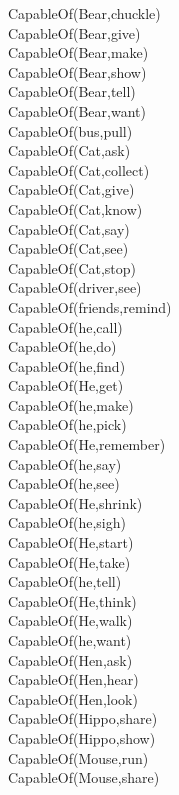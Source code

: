 \begin{multicols}{2}
\begin{footnotesize}
\noindent
CapableOf(Bear,chuckle) \\
CapableOf(Bear,give) \\
CapableOf(Bear,make) \\
CapableOf(Bear,show) \\
CapableOf(Bear,tell) \\
CapableOf(Bear,want) \\
CapableOf(bus,pull) \\
CapableOf(Cat,ask) \\
CapableOf(Cat,collect) \\
CapableOf(Cat,give) \\
CapableOf(Cat,know) \\
CapableOf(Cat,say) \\
CapableOf(Cat,see) \\
CapableOf(Cat,stop) \\
CapableOf(driver,see) \\
CapableOf(friends,remind) \\
CapableOf(he,call) \\
CapableOf(he,do) \\
CapableOf(he,find) \\
CapableOf(He,get) \\
CapableOf(he,make) \\
CapableOf(he,pick) \\
CapableOf(He,remember) \\
CapableOf(he,say) \\
CapableOf(he,see) \\
CapableOf(He,shrink) \\
CapableOf(he,sigh) \\
CapableOf(He,start) \\
CapableOf(He,take) \\
CapableOf(he,tell) \\
CapableOf(He,think) \\
CapableOf(He,walk) \\
CapableOf(he,want) \\
CapableOf(Hen,ask) \\
CapableOf(Hen,hear) \\
CapableOf(Hen,look) \\
CapableOf(Hippo,share) \\
CapableOf(Hippo,show) \\
CapableOf(Mouse,run) \\
CapableOf(Mouse,share) \\

\end{footnotesize}
\end{multicols}
